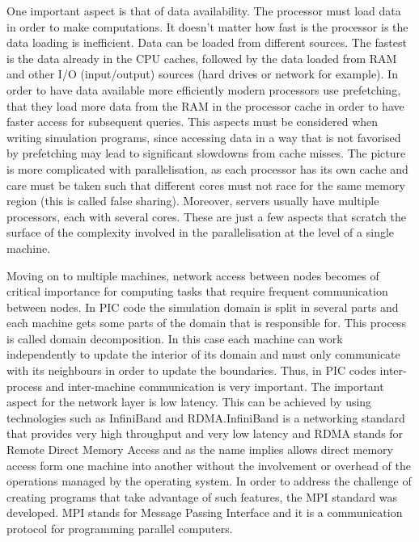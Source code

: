 \documentclass[12pt, class=report, crop=false]{standalone}
\begin{document}
One important aspect is that of data availability. The processor must load data
in order to make computations. It doesn't matter how fast is the processor is the
data loading is inefficient. Data can be loaded from different sources. The
fastest is the data already in the CPU caches, followed by the data loaded from RAM
and other I/O (input/output) sources (hard drives or network for example). In order to have data
available more efficiently modern processors use prefetching, that they load more
data from the RAM in the processor cache in order to have faster access for subsequent
queries. This aspects must be considered when writing simulation programs, since
accessing data in a way that is not favorised by prefetching may lead to significant
slowdowns from cache misses. The picture is more complicated with parallelisation,
as each processor has its own cache and care must be taken such that different
cores must not race for the same memory region (this is called false sharing).
Moreover, servers usually have multiple processors, each with several cores.
These are just a few aspects that scratch the surface of the complexity involved
in the parallelisation at the level of a single machine.

Moving on to multiple machines, network access between nodes becomes of critical
importance for computing tasks that require frequent communication between
nodes. In PIC code the simulation domain is split in several parts
and each machine gets some parts of the domain that is responsible for.
This process is called domain decomposition. In this case each machine can
work independently to update the interior of its domain and must only communicate
with its neighbours in order to update the boundaries. Thus, in PIC codes inter-process
and inter-machine communication is very important. The important aspect for the
network layer is low latency. This can be achieved by using technologies such as
InfiniBand and RDMA.\@ InfiniBand is a networking standard that provides very high
throughput and very low latency and RDMA stands for Remote Direct Memory Access
and as the name implies allows direct memory access form one machine into another
without the involvement or overhead of the operations managed by the operating system.
In order to address the challenge of creating programs that take advantage of such
features, the MPI standard was developed. MPI stands for Message Passing Interface
and it is a communication protocol for programming parallel computers.
\end{document}
